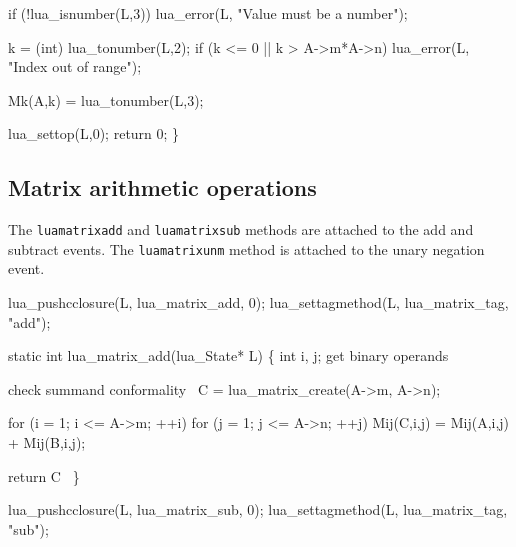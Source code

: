     if (!lua_isnumber(L,3))
        lua_error(L, "Value must be a number");

    k = (int) lua_tonumber(L,2);
    if (k <= 0 || k > A->m*A->n)
        lua_error(L, "Index out of range");

    Mk(A,k) = lua_tonumber(L,3);

    lua_settop(L,0);
    return 0;
\}

\nwendcode{}\nwdocspar


\subsection{Matrix arithmetic operations}

The {\tt{}lua{}matrix{}add} and {\tt{}lua{}matrix{}sub} methods are attached
to the add and subtract events.  The {\tt{}lua{}matrix{}unm} method is
attached to the unary negation event.

\nwenddocs{}\plusendmoddef
lua_pushcclosure(L, lua_matrix_add, 0);
lua_settagmethod(L, lua_matrix_tag, "add");
\nwendcode{}\nwdocspar

\nwenddocs{}\plusendmoddef
static int lua_matrix_add(lua_State* L)
\{
    int i, j;
    \LA{}get binary operands~{\nwtagstyle{}}\RA{}

    \LA{}check summand conformality~{\nwtagstyle{}}\RA{}
    C = lua_matrix_create(A->m, A->n);

    for (i = 1; i <= A->m; ++i)
        for (j = 1; j <= A->n; ++j)
            Mij(C,i,j) = Mij(A,i,j) + Mij(B,i,j);

    \LA{}return \code{}C\edoc{}~{\nwtagstyle{}}\RA{}
\}

\nwendcode{}\nwdocspar

\nwenddocs{}\plusendmoddef
lua_pushcclosure(L, lua_matrix_sub, 0);
lua_settagmethod(L, lua_matrix_tag, "sub");
\nwendcode{}\nwdocspar

